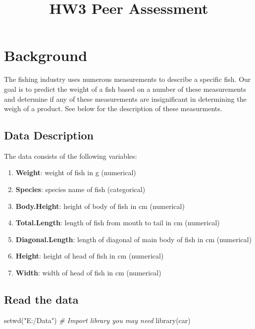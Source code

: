 \documentclass[
]{article}
\title{HW3 Peer Assessment}
\author{}
\date{\vspace{-2.5em}}
\newenvironment{Shaded}{\begin{snugshade}}{\end{snugshade}}
\newcommand{\CommentTok}[1]{\textcolor[rgb]{0.56,0.35,0.01}{\textit{#1}}}
\newcommand{\FunctionTok}[1]{\textcolor[rgb]{0.00,0.00,0.00}{#1}}
\newcommand{\NormalTok}[1]{#1}
\newcommand{\StringTok}[1]{\textcolor[rgb]{0.31,0.60,0.02}{#1}}
\providecommand{\tightlist}{%
  \setlength{\itemsep}{0pt}\setlength{\parskip}{0pt}}
\begin{document}
\maketitle

\hypertarget{background}{%
\section{Background}\label{background}}

The fishing industry uses numerous measurements to describe a specific
fish. Our goal is to predict the weight of a fish based on a number of
these measurements and determine if any of these measurements are
insignificant in determining the weigh of a product. See below for the
description of these measurments.

\hypertarget{data-description}{%
\subsection{Data Description}\label{data-description}}

The data consists of the following variables:

\begin{enumerate}
\def\labelenumi{\arabic{enumi}.}
\tightlist
\item
  \textbf{Weight}: weight of fish in g (numerical)
\item
  \textbf{Species}: species name of fish (categorical)
\item
  \textbf{Body.Height}: height of body of fish in cm (numerical)
\item
  \textbf{Total.Length}: length of fish from mouth to tail in cm
  (numerical)
\item
  \textbf{Diagonal.Length}: length of diagonal of main body of fish in
  cm (numerical)
\item
  \textbf{Height}: height of head of fish in cm (numerical)
\item
  \textbf{Width}: width of head of fish in cm (numerical)
\end{enumerate}

\hypertarget{read-the-data}{%
\subsection{Read the data}\label{read-the-data}}

\begin{Shaded}
\begin{Highlighting}[]
\FunctionTok{setwd}\NormalTok{(}\StringTok{"E:/Data"}\NormalTok{)}
\CommentTok{\# Import library you may need}
\FunctionTok{library}\NormalTok{(car)}
\end{Highlighting}
\end{Shaded}
\end{document}
